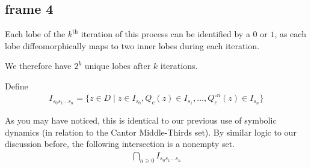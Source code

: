 \documentclass[xcolor=x11names,compress]{beamer}
\renewcommand{\(}{\begin{columns}}
\renewcommand{\)}{\end{columns}}
\newcommand{\<}[1]{\begin{column}{#1}}
\renewcommand{\>}{\end{column}}
\begin{document}
\subsection{frame 4}
\begin{frame}

Each lobe of the $k^{\text{th}}$ iteration of this process can be identified by a $0$ or $1$, as each lobe 
diffeomorphically maps to two inner lobes during each iteration. 

\vspace{.4cm}
\pause

We therefore have $2^k$ unique lobes after $k$ iterations.

\vspace{.4cm}
\pause

Define
\begin{align*}
I_{s_0s_1\ldots s_n} = \{z\in D \; | \;  z \in I_{s_0}, Q_c(z) \in I_{s_1}, \ldots, Q_c^{\circ n}(z) \in I_{s_n}\}
\end{align*}

\pause

As you may have noticed, this is identical to our previous use of symbolic dynamics (in relation
to the Cantor Middle-Thirds set). By similar logic to our discussion before, the following  
intersection is a nonempty set.
\begin{align*}
\bigcap\limits_{n\ge 0} I_{s_0s_1 \ldots s_n}
\end{align*}



\end{frame}


\end{document}
